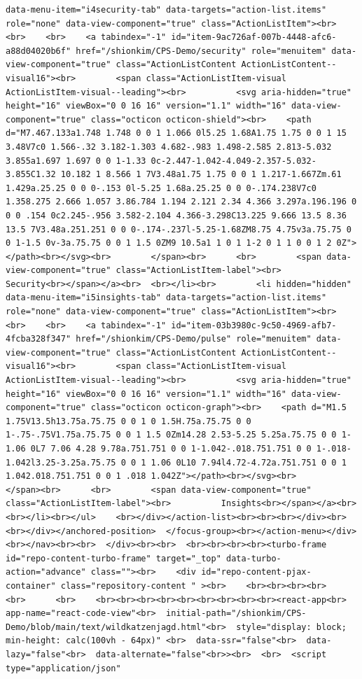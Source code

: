 \documentclass[
  letterpaper,
]{book}
\begin{document}
\begin{verbatim}
data-menu-item="i4security-tab" data-targets="action-list.items" role="none" data-view-component="true" class="ActionListItem"><br>    <br>    <br>    <a tabindex="-1" id="item-9ac726af-007b-4448-afc6-a88d04020b6f" href="/shionkim/CPS-Demo/security" role="menuitem" data-view-component="true" class="ActionListContent ActionListContent--visual16"><br>        <span class="ActionListItem-visual ActionListItem-visual--leading"><br>          <svg aria-hidden="true" height="16" viewBox="0 0 16 16" version="1.1" width="16" data-view-component="true" class="octicon octicon-shield"><br>    <path d="M7.467.133a1.748 1.748 0 0 1 1.066 0l5.25 1.68A1.75 1.75 0 0 1 15 3.48V7c0 1.566-.32 3.182-1.303 4.682-.983 1.498-2.585 2.813-5.032 3.855a1.697 1.697 0 0 1-1.33 0c-2.447-1.042-4.049-2.357-5.032-3.855C1.32 10.182 1 8.566 1 7V3.48a1.75 1.75 0 0 1 1.217-1.667Zm.61 1.429a.25.25 0 0 0-.153 0l-5.25 1.68a.25.25 0 0 0-.174.238V7c0 1.358.275 2.666 1.057 3.86.784 1.194 2.121 2.34 4.366 3.297a.196.196 0 0 0 .154 0c2.245-.956 3.582-2.104 4.366-3.298C13.225 9.666 13.5 8.36 13.5 7V3.48a.251.251 0 0 0-.174-.237l-5.25-1.68ZM8.75 4.75v3a.75.75 0 0 1-1.5 0v-3a.75.75 0 0 1 1.5 0ZM9 10.5a1 1 0 1 1-2 0 1 1 0 0 1 2 0Z"></path><br></svg><br>        </span><br>      <br>        <span data-view-component="true" class="ActionListItem-label"><br>          Security<br></span></a><br>  <br></li><br>        <li hidden="hidden" data-menu-item="i5insights-tab" data-targets="action-list.items" role="none" data-view-component="true" class="ActionListItem"><br>    <br>    <br>    <a tabindex="-1" id="item-03b3980c-9c50-4969-afb7-4fcba328f347" href="/shionkim/CPS-Demo/pulse" role="menuitem" data-view-component="true" class="ActionListContent ActionListContent--visual16"><br>        <span class="ActionListItem-visual ActionListItem-visual--leading"><br>          <svg aria-hidden="true" height="16" viewBox="0 0 16 16" version="1.1" width="16" data-view-component="true" class="octicon octicon-graph"><br>    <path d="M1.5 1.75V13.5h13.75a.75.75 0 0 1 0 1.5H.75a.75.75 0 0 1-.75-.75V1.75a.75.75 0 0 1 1.5 0Zm14.28 2.53-5.25 5.25a.75.75 0 0 1-1.06 0L7 7.06 4.28 9.78a.751.751 0 0 1-1.042-.018.751.751 0 0 1-.018-1.042l3.25-3.25a.75.75 0 0 1 1.06 0L10 7.94l4.72-4.72a.751.751 0 0 1 1.042.018.751.751 0 0 1 .018 1.042Z"></path><br></svg><br>        </span><br>      <br>        <span data-view-component="true" class="ActionListItem-label"><br>          Insights<br></span></a><br>  <br></li><br></ul>    <br></div></action-list><br><br><br></div><br>      <br></div></anchored-position>  </focus-group><br></action-menu></div><br></nav><br><br>  </div><br><br>  <br><br><br><br><turbo-frame id="repo-content-turbo-frame" target="_top" data-turbo-action="advance" class=""><br>    <div id="repo-content-pjax-container" class="repository-content " ><br>    <br><br><br><br>    <br>      <br>    <br><br><br><br><br><br><br><br><br><react-app<br>  app-name="react-code-view"<br>  initial-path="/shionkim/CPS-Demo/blob/main/text/wildkatzenjagd.html"<br>  style="display: block; min-height: calc(100vh - 64px)" <br>  data-ssr="false"<br>  data-lazy="false"<br>  data-alternate="false"<br>><br>  <br>  <script type="application/json" 
\end{verbatim}
\end{document}
